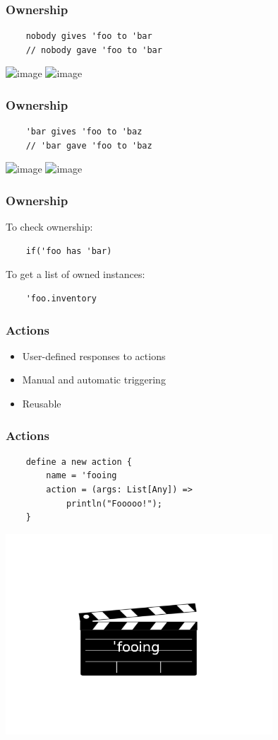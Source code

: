 \documentclass{beamer}
\begin{document}
\begin{frame}[fragile]
    \frametitle{Ownership}
    \begin{lstlisting}
    nobody gives 'foo to 'bar
    // nobody gave 'foo to 'bar
    \end{lstlisting}
    \includegraphics<1>[width=13cm]{nobody-gives1}
    \includegraphics<2>[width=13cm]{nobody-gives2}
\end{frame}

\begin{frame}[fragile]
    \frametitle{Ownership}
    \begin{lstlisting}
    'bar gives 'foo to 'baz
    // 'bar gave 'foo to 'baz
    \end{lstlisting}
    \includegraphics<1>[width=13cm]{bar-gives1}
    \includegraphics<2>[width=13cm]{bar-gives2}
\end{frame}

\begin{frame}[fragile]
    \frametitle{Ownership}
    To check ownership:
    \begin{lstlisting}
    if('foo has 'bar)
    \end{lstlisting}

    To get a list of owned instances:
    \begin{lstlisting}
    'foo.inventory
    \end{lstlisting}
\end{frame}

\begin{frame}
    \frametitle{Actions}
    \begin{itemize}[<+->]
        \item{User-defined responses to actions}
        \item{Manual and automatic triggering}
        \item{Reusable}
    \end{itemize}
\end{frame}

\begin{frame}[fragile]
    \frametitle{Actions}
    \begin{lstlisting}
    define a new action {
        name = 'fooing
        action = (args: List[Any]) =>
            println("Fooooo!");
    }
    \end{lstlisting}
    \includegraphics[width=10cm]{fooing}
\end{frame}
\end{document}
